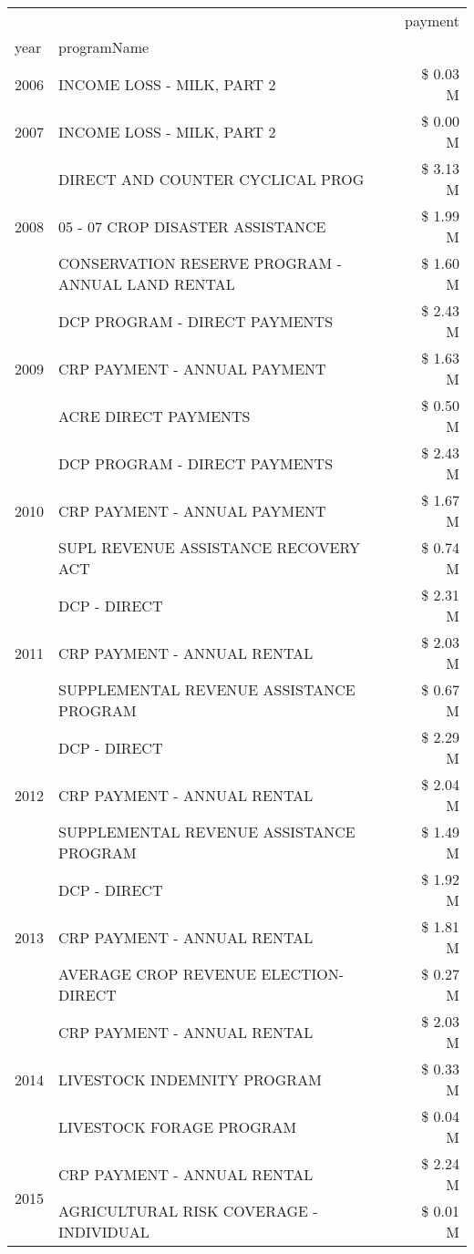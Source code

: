 \begin{tabular}{llr}
\toprule
 &  & payment \\
year & programName &  \\
\midrule
2006 & INCOME LOSS - MILK, PART 2 & \$ 0.03 M \\
\cline{1-3}
2007 & INCOME LOSS - MILK, PART 2 & \$ 0.00 M \\
\cline{1-3}
\multirow[t]{3}{*}{2008} & DIRECT AND COUNTER CYCLICAL PROG & \$ 3.13 M \\
 & 05 - 07 CROP DISASTER ASSISTANCE & \$ 1.99 M \\
 & CONSERVATION RESERVE PROGRAM - ANNUAL LAND RENTAL & \$ 1.60 M \\
\cline{1-3}
\multirow[t]{3}{*}{2009} & DCP PROGRAM - DIRECT PAYMENTS & \$ 2.43 M \\
 & CRP PAYMENT - ANNUAL PAYMENT & \$ 1.63 M \\
 & ACRE DIRECT PAYMENTS & \$ 0.50 M \\
\cline{1-3}
\multirow[t]{3}{*}{2010} & DCP PROGRAM - DIRECT PAYMENTS & \$ 2.43 M \\
 & CRP PAYMENT - ANNUAL PAYMENT & \$ 1.67 M \\
 & SUPL REVENUE ASSISTANCE RECOVERY ACT & \$ 0.74 M \\
\cline{1-3}
\multirow[t]{3}{*}{2011} & DCP - DIRECT & \$ 2.31 M \\
 & CRP PAYMENT - ANNUAL RENTAL & \$ 2.03 M \\
 & SUPPLEMENTAL REVENUE ASSISTANCE PROGRAM & \$ 0.67 M \\
\cline{1-3}
\multirow[t]{3}{*}{2012} & DCP - DIRECT & \$ 2.29 M \\
 & CRP PAYMENT - ANNUAL RENTAL & \$ 2.04 M \\
 & SUPPLEMENTAL REVENUE ASSISTANCE PROGRAM & \$ 1.49 M \\
\cline{1-3}
\multirow[t]{3}{*}{2013} & DCP - DIRECT & \$ 1.92 M \\
 & CRP PAYMENT - ANNUAL RENTAL & \$ 1.81 M \\
 & AVERAGE CROP REVENUE ELECTION-DIRECT & \$ 0.27 M \\
\cline{1-3}
\multirow[t]{3}{*}{2014} & CRP PAYMENT - ANNUAL RENTAL & \$ 2.03 M \\
 & LIVESTOCK INDEMNITY PROGRAM & \$ 0.33 M \\
 & LIVESTOCK FORAGE PROGRAM & \$ 0.04 M \\
\cline{1-3}
\multirow[t]{3}{*}{2015} & CRP PAYMENT - ANNUAL RENTAL & \$ 2.24 M \\
 & AGRICULTURAL RISK COVERAGE - INDIVIDUAL & \$ 0.01 M \\

\end{tabular}
